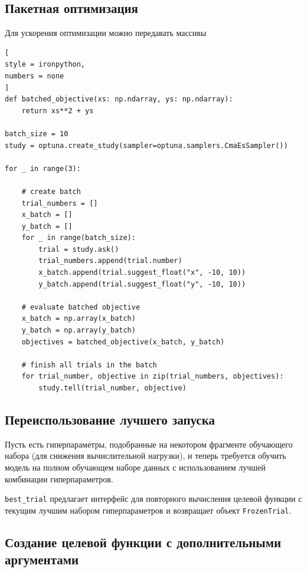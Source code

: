 \documentclass[%
	11pt,
	a4paper,
	utf8,
		]{article}
\begin{document}
\subsection{Пакетная оптимизация}

Для ускорения оптимизации можно передавать массивы 
\begin{lstlisting}[
style = ironpython,
numbers = none
]
def batched_objective(xs: np.ndarray, ys: np.ndarray):
	return xs**2 + ys

batch_size = 10
study = optuna.create_study(sampler=optuna.samplers.CmaEsSampler())

for _ in range(3):

	# create batch
	trial_numbers = []
	x_batch = []
	y_batch = []
	for _ in range(batch_size):
		trial = study.ask()
		trial_numbers.append(trial.number)
		x_batch.append(trial.suggest_float("x", -10, 10))
		y_batch.append(trial.suggest_float("y", -10, 10))
	
	# evaluate batched objective
	x_batch = np.array(x_batch)
	y_batch = np.array(y_batch)
	objectives = batched_objective(x_batch, y_batch)

	# finish all trials in the batch
	for trial_number, objective in zip(trial_numbers, objectives):
		study.tell(trial_number, objective)
\end{lstlisting}

\subsection{Переиспользование лучшего запуска}

Пусть есть гиперпараметры, подобранные на некотором фрагменте обучающего набора (для снижения вычислительной нагрузки), и теперь требуется обучить модель на полном обучающем наборе данных с использованием лучшей комбинации гиперпараметров.

\verb|best_trial| предлагает интерфейс для повторного вычисления целевой функции с текущим лучшим набором гиперпараметров и возвращает объект \verb|FrozenTrial|.

\subsection{Создание целевой функции с дополнительными аргументами}
\end{document}
